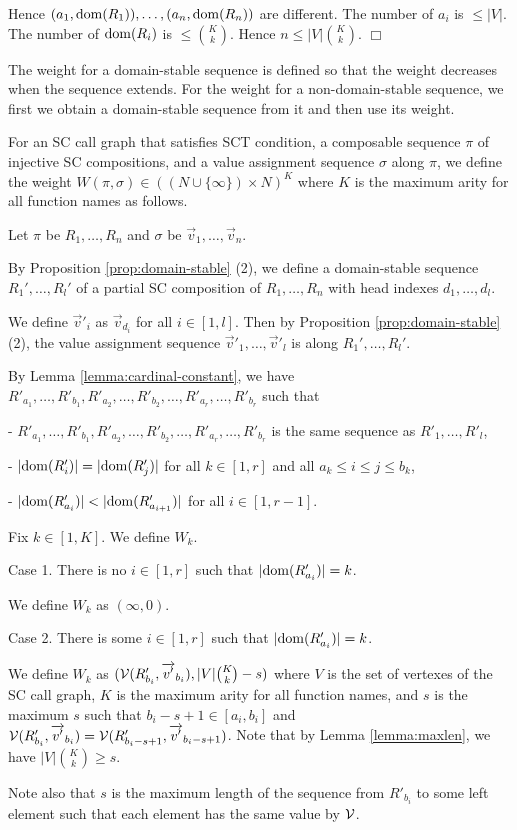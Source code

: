 Hence $(a_1,{\rm dom}(R_1)),\ldots, (a_n,{\rm dom}(R_n))$ are different.
The number of $a_i$ is $\le |V|$.
The number of ${\rm dom}(R_i)$ is $\le {K \choose k}$.
Hence $n \le |V|{K \choose k}$.
$\Box$

The weight for a domain-stable sequence is defined so that
the weight decreases when the sequence extends.
For the weight for a non-domain-stable sequence,
we first we obtain a domain-stable sequence from it and then use its weight.

\begin{Def}[Weight]\label{def:weight}\rm
For an SC call graph that satisfies SCT condition,
a composable sequence $\pi$ of injective SC compositions, and 
a value assignment sequence $\sigma$ along $\pi$,
we define the weight $W(\pi, \sigma) \in ((N\cup\{\infty\}) \times N)^{K}$ 
where $K$ is the maximum arity for all function names
as follows.

Let $\pi$ be $R_1,\ldots, R_n$ and
$\sigma$ be $\Vec v_1,\ldots,\Vec v_n$.

By Proposition \ref{prop:domain-stable} (2), we define
a domain-stable sequence $R_1',\ldots,R_l'$ 
of a partial SC composition of $R_1,\ldots, R_n$ with 
head indexes $d_1,\ldots,d_l$.

We define $\Vec v'_i$ as $\Vec v_{d_i}$ for all $i \in [1,l]$.
Then by Proposition \ref{prop:domain-stable} (2), 
the value assignment sequence $\Vec v'_1,\ldots,\Vec v'_l$ is
along $R_1',\ldots,R_l'$.

By Lemma \ref{lemma:cardinal-constant},
we have
$R'_{a_1},\ldots,R'_{b_1},R'_{a_2},\ldots,R'_{b_2},\ldots, 
R'_{a_r},\ldots,R'_{b_r}$ such that

- $R'_{a_1},\ldots,R'_{b_1},R'_{a_2},\ldots,R'_{b_2},\ldots,
R'_{a_r},\ldots,R'_{b_r}$
is the same sequence as $R'_1,\ldots,R'_l$,

- $|{\rm dom}(R'_i)| = |{\rm dom}(R'_j)|$ for all $k \in [1,r]$ and
all $a_k \le i \le j \le b_k$,

- $|{\rm dom}(R'_{a_i})| < |{\rm dom}(R'_{a_{i+1}})|$ for all $i \in [1,r-1]$.

Fix $k \in [1,K]$. We define $W_k$.

Case 1. There is no $i \in [1,r]$ such that $|{\rm dom}(R'_{a_i})| = k$.

We define $W_k$ as $(\infty,0)$.

Case 2. There is some $i \in [1,r]$ such that $|{\rm dom}(R'_{a_i})| = k$.

We define $W_k$ as $({{\mathcal V}}(R'_{b_i}, \overrightarrow {v'}_{b_i}),|V|{K \choose k}-s)$
where $V$ is the set of vertexes of the SC call graph,
$K$ is the maximum arity for all function names,
and $s$ is the maximum $s$ such that
$b_i-s+1 \in [a_i,b_i]$ and
${{\mathcal V}}(R'_{b_i}, \overrightarrow {v'}_{b_i}) = {{\mathcal V}}(R'_{b_i-s+1}, \overrightarrow {v'}_{b_i-s+1})$.
Note that by Lemma \ref{lemma:maxlen}, we have $|V|{K \choose k} \ge s$.

Note also that $s$ is the maximum length of the sequence from $R'_{b_i}$
to some left element
such that each element has the same value by ${{\mathcal V}}$.
\end{Def}


